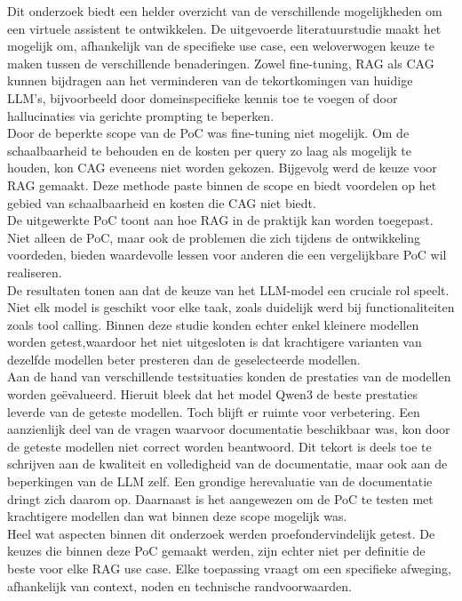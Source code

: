 Dit onderzoek biedt een helder overzicht van de verschillende mogelijkheden om een virtuele assistent te ontwikkelen. De uitgevoerde literatuurstudie maakt het mogelijk om, afhankelijk van de specifieke use case, een weloverwogen keuze te maken tussen de verschillende benaderingen. Zowel fine-tuning, RAG als CAG kunnen bijdragen aan het verminderen van de tekortkomingen van huidige LLM's, bijvoorbeeld door domeinspecifieke kennis toe te voegen of door hallucinaties via gerichte prompting te beperken.
\\[1em]
Door de beperkte scope van de PoC was fine-tuning niet mogelijk. Om de schaalbaarheid te behouden en de kosten per query zo laag als mogelijk te houden, kon CAG eveneens niet worden gekozen. Bijgevolg werd de keuze voor RAG gemaakt. Deze methode paste binnen de scope en biedt voordelen op het gebied van schaalbaarheid en kosten die CAG niet biedt.
\\[1em]
De uitgewerkte PoC toont aan hoe RAG in de praktijk kan worden toegepast. Niet alleen de PoC, maar ook de problemen die zich tijdens de ontwikkeling voordeden, bieden waardevolle lessen voor anderen die een vergelijkbare PoC wil realiseren.
\\[1em]
De resultaten tonen aan dat de keuze van het LLM-model een cruciale rol speelt. Niet elk model is geschikt voor elke taak, zoals duidelijk werd bij functionaliteiten zoals tool calling. Binnen deze studie konden echter enkel kleinere modellen worden getest,waardoor het niet uitgesloten is dat krachtigere varianten van dezelfde modellen beter presteren dan de geselecteerde modellen.
\\[1em]
Aan de hand van verschillende testsituaties konden de prestaties van de modellen worden geëvalueerd. Hieruit bleek dat het model Qwen3 de beste prestaties leverde van de geteste modellen. Toch blijft er ruimte voor verbetering. Een aanzienlijk deel van de vragen waarvoor documentatie beschikbaar was, kon door de geteste modellen niet correct worden beantwoord. Dit tekort is deels toe te schrijven aan de kwaliteit en volledigheid van de documentatie, maar ook aan de beperkingen van de LLM zelf. Een grondige herevaluatie van de documentatie dringt zich daarom op. Daarnaast is het aangewezen om de PoC te testen met krachtigere modellen dan wat binnen deze scope mogelijk was.
\\[1em]
Heel wat aspecten binnen dit onderzoek werden proefondervindelijk getest. De keuzes die binnen deze PoC gemaakt werden, zijn echter niet per definitie de beste voor elke RAG use case. Elke toepassing vraagt om een specifieke afweging, afhankelijk van context, noden en technische randvoorwaarden.
